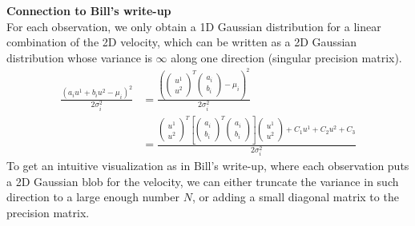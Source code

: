 \documentclass{article}
\begin{document}
\noindent\textbf{Connection to Bill's write-up}\\
For each observation, we only obtain a 1D Gaussian distribution
for a linear combination of the 2D velocity, 
which can be written as a 2D Gaussian distribution whose 
variance is $\infty$ along one direction (singular precision matrix).
\begin{align}
\frac{(a_iu^1+b_iu^2-\mu_i)^2}{2\sigma_i^2}
&=
\frac{(\left( \begin{array}{c} u^1\\u^2 \end{array} \right)^T
\left( \begin{array}{c} a_i\\b_i \end{array} \right)-\mu_i)^2}{2\sigma_i^2}\nonumber\\
&=
\frac{
\left( \begin{array}{c} u^1\\u^2 \end{array} \right)^T
\left[
\left( \begin{array}{c} a_i\\b_i\end{array} \right)^T
\left( \begin{array}{c} a_i\\b_i\end{array} \right)
\right]
\left( \begin{array}{c} u^1\\u^2 \end{array} \right)
+C_1u^1+C_2u^2+C_3
}{2\sigma_i^2}
\end{align}
To get an intuitive visualization as in Bill's write-up,
where each observation puts a 2D Gaussian blob for the velocity,
we can either truncate the variance in such direction to a large enough number $N$,
or adding a small diagonal matrix to the precision matrix.
\end{document}
